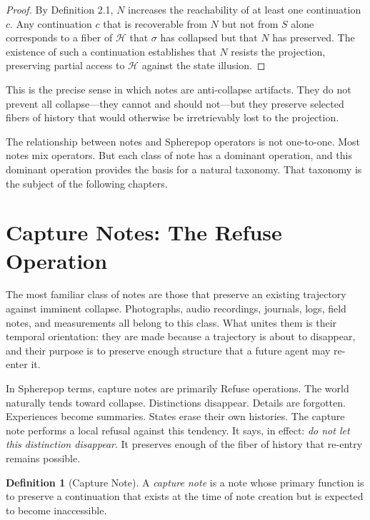 \documentclass[12pt, a4paper]{article}
\theoremstyle{plain}
\theoremstyle{definition}
\newtheorem{definition}[theorem]{Definition}
\theoremstyle{remark}
\begin{document}
\begin{proof}
By Definition 2.1, $N$ increases the reachability of at least one continuation
$c$. Any continuation $c$ that is recoverable from $N$ but not from $S$ alone
corresponds to a fiber of $\mathcal{H}$ that $\sigma$ has collapsed but that $N$
has preserved. The existence of such a continuation establishes that $N$ resists
the projection, preserving partial access to $\mathcal{H}$ against the state
illusion.
\end{proof}

This is the precise sense in which notes are anti-collapse artifacts. They do not
prevent all collapse---they cannot and should not---but they preserve selected
fibers of history that would otherwise be irretrievably lost to the projection.

The relationship between notes and Spherepop operators is not one-to-one.
Most notes mix operators. But each class of note has a dominant operation, and
this dominant operation provides the basis for a natural taxonomy. That taxonomy
is the subject of the following chapters.

\section{Capture Notes: The Refuse Operation}

The most familiar class of notes are those that preserve an existing trajectory
against imminent collapse. Photographs, audio recordings, journals, logs, field
notes, and measurements all belong to this class. What unites them is their
temporal orientation: they are made because a trajectory is about to disappear,
and their purpose is to preserve enough structure that a future agent may re-enter
it.

In Spherepop terms, capture notes are primarily Refuse operations. The world
naturally tends toward collapse. Distinctions disappear. Details are forgotten.
Experiences become summaries. States erase their own histories. The capture note
performs a local refusal against this tendency. It says, in effect: \emph{do not
let this distinction disappear}. It preserves enough of the fiber of history that
re-entry remains possible.

\begin{definition}[Capture Note]
A \emph{capture note} is a note whose primary function is to preserve a
continuation that exists at the time of note creation but is expected to become
inaccessible.
\end{definition}
\end{document}
